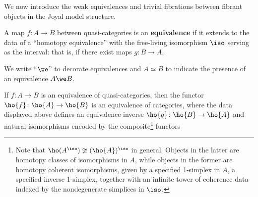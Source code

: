 We now introduce the weak equivalences and trivial fibrations between fibrant objects in the Joyal model structure.

\begin{definition}\label{defn:qcat-equivalence}
  A map $f \colon A \to B$ between quasi-categories is an \textbf{equivalence} if it extends to the data of a ``homotopy equivalence'' with the free-living isomorphism $\iso$ serving as the interval: that is, if there exist maps $g \colon B \to A$,
  \begin{center}
  \end{center}
  We write ``$\we$'' to decorate equivalences and $A \simeq B$ to indicate the presence of an equivalence $A \we B$.
  \end{definition}

  \begin{lemma}\label{lem:qcat-htpy-cat-equiv}
    If $f \colon A \to B$ is an equivalence of quasi-categories, then the functor $\ho{f} \colon \ho{A} \to \ho{B}$ is an equivalence of categories, where the data displayed above defines an equivalence inverse $\ho{g} \colon \ho{B} \to \ho{A}$ and natural isomorphisms encoded by the composite\footnote{Note that $\ho(A^\iso) \ncong (\ho{A})^\iso$ in general. Objects in the latter are homotopy classes of isomorphisms in $A$, while objects in the former are homotopy coherent isomorphisms, given by a specified 1-simplex in $A$, a specified inverse 1-simplex, together with an infinite tower of coherence data indexed by the nondegenerate simplices in $\iso$.} functors
  \begin{center} 
  \end{center}
  \end{lemma}

